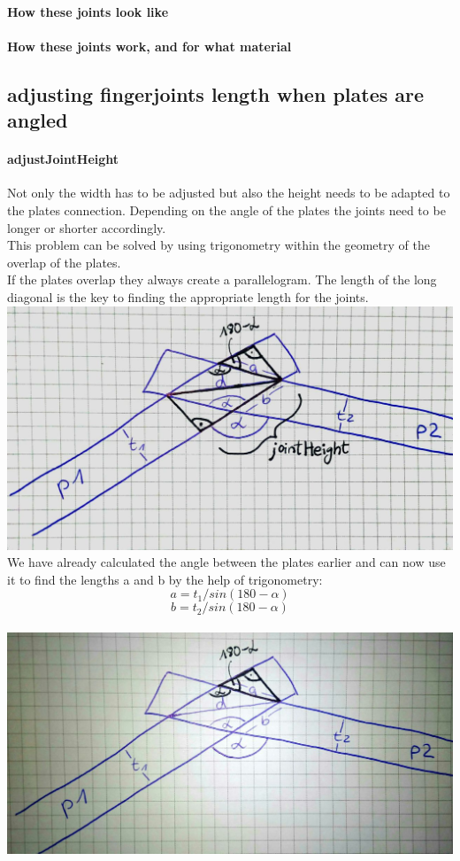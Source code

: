 \documentclass[../ClassicThesis.tex]{subfiles}
\begin{document}
    \paragraph{How these joints look like}
    \paragraph{How these joints work, and for what material}

\subsection{adjusting fingerjoints length when plates are angled}
    \paragraph{adjustJointHeight}
    Not only the width has to be adjusted but also the height needs to be adapted to the plates connection. Depending on the angle of the plates the joints need to be longer or shorter accordingly.\\
    This problem can be solved by using trigonometry within the geometry of the overlap of the plates.\\
    If the plates overlap they always create a parallelogram. The length of the long diagonal is the key to finding the appropriate length for the joints.\\
    \includegraphics[width=0.5\columnwidth]{Images/06-2-joints-newJointHeight1.jpg}\\
    We have already calculated the angle between the plates earlier and can now use it to find the lengths a and b by the help of trigonometry:\\
    $$ a = t_1 / sin(180 - \alpha)$$
    $$ b = t_2 / sin(180 - \alpha)$$\\
    \includegraphics[width=0.5\columnwidth]{Images/06-2-joints-newJointHeight2.jpg}\\
\end{document}
